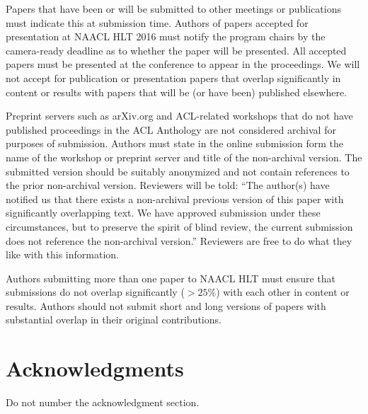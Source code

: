 \documentclass[11pt,letterpaper]{article}
\begin{document}
Papers that have been or will be submitted to other meetings or
publications must indicate this at submission time. Authors of
papers accepted for presentation at NAACL HLT 2016 must notify the
program chairs by the camera-ready deadline as to whether the paper
will be presented. All accepted papers must be presented at the
conference to appear in the proceedings. We will not accept for
publication or presentation papers that overlap significantly in
content or results with papers that will be (or have been) published
elsewhere.

Preprint servers such as arXiv.org and ACL-related workshops that
do not have published proceedings in the ACL Anthology are not
considered archival for purposes of submission. Authors must state
in the online submission form the name of the workshop or preprint
server and title of the non-archival version.  The submitted version
should be suitably anonymized and not contain references to the
prior non-archival version. Reviewers will be told: ``The author(s)
have notified us that there exists a non-archival previous version
of this paper with significantly overlapping text. We have approved
submission under these circumstances, but to preserve the spirit
of blind review, the current submission does not reference the
non-archival version.'' Reviewers are free to do what they like with
this information.

Authors submitting more than one paper to NAACL HLT must ensure
that submissions do not overlap significantly ($>25\%$) with each other
in content or results. Authors should not submit short and long
versions of papers with substantial overlap in their original
contributions.

\section*{Acknowledgments}

Do not number the acknowledgment section.
\end{document}
